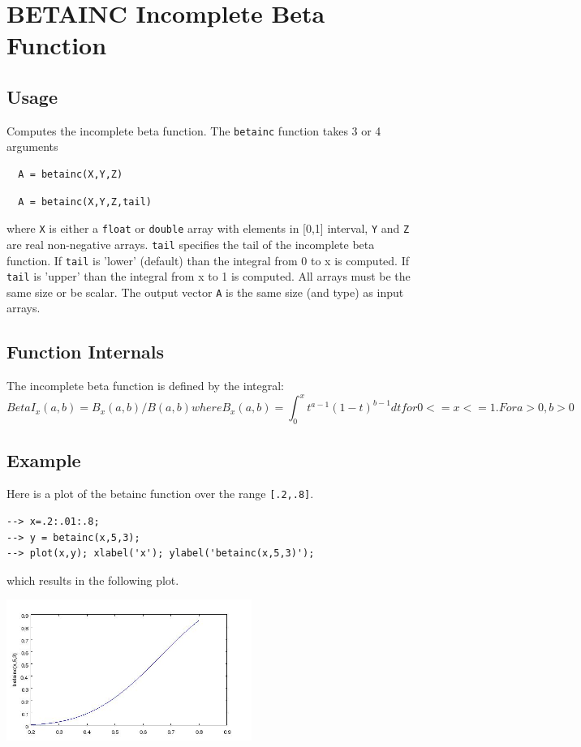 \section{BETAINC Incomplete Beta Function}

\subsection{Usage}

Computes the incomplete beta function.  The \verb|betainc|
function takes 3 or 4 arguments
\begin{verbatim}
  A = betainc(X,Y,Z)
\end{verbatim}
\begin{verbatim}
  A = betainc(X,Y,Z,tail)
\end{verbatim}
where \verb|X| is either a \verb|float| or \verb|double| array with elements in [0,1] interval, \verb|Y| and \verb|Z| are real non-negative arrays. 
\verb|tail| specifies the tail of the incomplete beta function. 
If \verb|tail| is 'lower' (default) than the integral from 0 to x is computed. If \verb|tail| is 'upper' than the integral from x to 1 is computed.
All arrays must be the same size or be scalar. The output
vector \verb|A| is the same size (and type) as input arrays.
\subsection{Function Internals}

The incomplete beta function is defined by the integral:
\[
  BetaI_x(a,b)=B_x(a,b)/B(a,b) where B_x(a,b) = \int_0^x t^{a-1} (1-t)^{b-1} dt 
  for 0 <= x <= 1. For a > 0, b > 0
\]
\subsection{Example}

Here is a plot of the betainc function over the range \verb|[.2,.8]|.
\begin{verbatim}
--> x=.2:.01:.8;
--> y = betainc(x,5,3);
--> plot(x,y); xlabel('x'); ylabel('betainc(x,5,3)');
\end{verbatim}
which results in the following plot.


\centerline{\includegraphics[width=8cm]{betainc1}}

